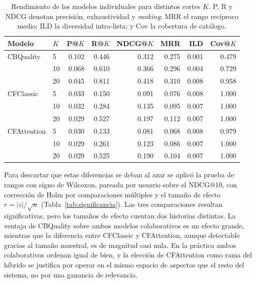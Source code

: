 \begin{table}[ht]
	\centering
	\caption{Rendimiento de los modelos individuales para distintos cortes $K$. P, R y NDCG
		denotan precisión, exhaustividad y \textit{ranking}; MRR el rango recíproco medio; ILD la
		diversidad intra-lista; y Cov la cobertura de catálogo.}
	\label{tab:modelos}
	\begin{tabular}{llrrrrrr}
		\toprule
		\textbf{Modelo} & \textbf{$K$} & \textbf{P@$K$} & \textbf{R@$K$} & \textbf{NDCG@$K$} & \textbf{MRR} & \textbf{ILD} & \textbf{Cov@$K$} \\
		\midrule
		CBQuality       & 5            & 0.102          & 0.446          & 0.312             & 0.275        & 0.001        & 0.479            \\
		                & 10           & 0.068          & 0.610          & 0.366             & 0.296        & 0.004        & 0.729            \\
		                & 20           & 0.045          & 0.811          & 0.418             & 0.310        & 0.008        & 0.958            \\
		\midrule
		CFClassic       & 5            & 0.033          & 0.150          & 0.091             & 0.076        & 0.008        & 1.000            \\
		                & 10           & 0.032          & 0.284          & 0.135             & 0.095        & 0.007        & 1.000            \\
		                & 20           & 0.029          & 0.527          & 0.197             & 0.112        & 0.007        & 1.000            \\
		\midrule
		CFAttention     & 5            & 0.030          & 0.133          & 0.081             & 0.068        & 0.008        & 0.979            \\
		                & 10           & 0.029          & 0.261          & 0.123             & 0.086        & 0.007        & 1.000            \\
		                & 20           & 0.029          & 0.525          & 0.190             & 0.104        & 0.007        & 1.000            \\
		\bottomrule
	\end{tabular}
\end{table}

Para descartar que estas diferencias se deban al azar se aplicó la prueba de rangos con
signo de Wilcoxon, pareada por usuario sobre el NDCG@10, con corrección de Holm por
comparaciones múltiples y el tamaño de efecto $r = |z| / \sqrt{n}$
(Tabla~\ref{tab:significancia}). Las tres comparaciones resultan significativas, pero los
tamaños de efecto cuentan dos historias distintas. La ventaja de CBQuality sobre ambos
modelos colaborativos es un efecto grande, mientras que la diferencia entre CFClassic y
CFAttention, aunque detectable gracias al tamaño muestral, es de magnitud casi nula. En la
práctica ambos colaborativos ordenan igual de bien, y la elección de CFAttention como rama
del híbrido se justifica por operar en el mismo espacio de aspectos que el resto del
sistema, no por una ganancia de relevancia.


